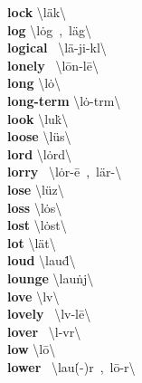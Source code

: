 \documentclass[10pt,a4paper]{article}
\begin{document}
\begin{multicols}{2}
\textbf{ lock }\quad \textbackslash \textprimstress l\"{a}k\textbackslash \\
\textbf{ log }\quad \textbackslash \textprimstress l\.{o}g\ ,\ \textprimstress l\"{a}g\textbackslash \\
\textbf{ logical }\quad \ \textbackslash \textprimstress l\"{a}-ji-k\textschwa l\textbackslash \\
\textbf{ lonely }\quad \ \textbackslash \textprimstress l\={o}n-l\={e}\textbackslash \\
\textbf{ long }\quad \textbackslash \textprimstress l\.{o}\engma \textbackslash \\
\textbf{ long-term }\quad \textbackslash \textprimstress l\.{o}\engma -\textprimstress t\textschwa rm\textbackslash \\
\textbf{ look }\quad \textbackslash \textprimstress lu\. k\textbackslash \\
\textbf{ loose }\quad \textbackslash \textprimstress l\"{u}s\textbackslash \\
\textbf{ lord }\quad \textbackslash \textprimstress l\.{o}rd\textbackslash \\
\textbf{ lorry }\quad \ \textbackslash \textprimstress l\.{o}r-\={e}\ ,\ \textprimstress l\"{a}r-\textbackslash \\
\textbf{ lose }\quad \textbackslash \textprimstress l\"{u}z\textbackslash \\
\textbf{ loss }\quad \textbackslash \textprimstress l\.{o}s\textbackslash \\
\textbf{ lost }\quad \textbackslash \textprimstress l\.{o}st\textbackslash \\
\textbf{ lot }\quad \textbackslash \textprimstress l\"{a}t\textbackslash \\
\textbf{ loud }\quad \textbackslash \textprimstress lau\. d\textbackslash \\
\textbf{ lounge }\quad \textbackslash \textprimstress lau\. nj\textbackslash \\
\textbf{ love }\quad \textbackslash \textprimstress l\textschwa v\textbackslash \\
\textbf{ lovely }\quad \ \textbackslash \textprimstress l\textschwa v-l\={e}\textbackslash \\
\textbf{ lover }\quad \ \textbackslash \textprimstress l\textschwa -v\textschwa r\textbackslash \\
\textbf{ low }\quad \textbackslash \textprimstress l\={o}\textbackslash \\
\textbf{ lower }\quad \ \textbackslash \textprimstress lau\. (-\textschwa )r\ ,\ \textprimstress l\={o}-\textschwa r\textbackslash \\

\end{multicols}
\end{document}
